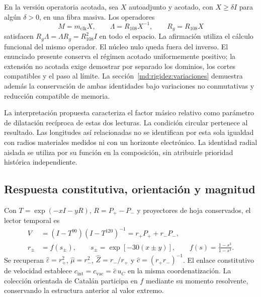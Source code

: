 En la versión operatoria acotada, sea $X$ autoadjunto y acotado, con
$X\geq\delta I$ para algún $\delta>0$, en una fibra masiva. Los operadores
\begin{equation}
 M=m_{\mathrm{clk}}X,\qquad
 \Lambda=R_{108}X^{-1},\qquad R_g=R_{108}X
 \label{md:hib:operadores-radiales}
\end{equation}
satisfacen $R_g\Lambda=\Lambda R_g=R_{108}^2I$ en todo el espacio.
La afirmación utiliza el cálculo funcional del mismo operador. El núcleo
nulo queda fuera del inverso. El enunciado presente conserva el régimen
acotado uniformemente positivo; la extensión no acotada exige demostrar
por separado los dominios, los cortes compatibles y el paso al límite.
La sección~\ref{md:rigidez:variaciones} demuestra además la conservación
de ambas identidades bajo variaciones no conmutativas y reducción
compatible de memoria.

La interpretación propuesta caracteriza el factor másico relativo como
parámetro de dilatación recíproca de estas dos lecturas. La condición circular
pertenece al resultado. Las longitudes así relacionadas no se identifican
por esta sola igualdad con radios materiales medidos ni con un horizonte
electrónico. La identidad radial aislada se utiliza por su función en la
composición, sin atribuirle prioridad histórica independiente.

\subsection{Respuesta constitutiva, orientación y magnitud}
\label{md:hib:constitutivas}

Con $T=\exp(-xI-yR)$, $R=P_+-P_-$ y proyectores de hoja conservados,
el lector temporal es
\begin{equation}
 \begin{aligned}
 V&=(I-T^{90})(I-T^{120})^{-1}=r_+P_++r_-P_-,\\
 r_\pm&=f(s_\pm),\qquad
 s_\pm=\exp[-30(x\pm y)],\qquad
 f(s)=\frac{1-s^3}{1-s^4}.
 \end{aligned}
 \label{md:hib:operador-constitutivo}
\end{equation}
Se recuperan $\widehat\varepsilon=r_+^2$, $\widehat\mu=r_-^2$,
$\widehat Z=r_-/r_+$ y $\widehat c=(r_+r_-)^{-1}$.
El enlace constitutivo de velocidad establece
$c_{\mathrm{int}}=c_{\mathrm{vac}}=\widehat c\,u_C$ en la misma coordenatización.
La colección orientada de Catalán participa en $f$ mediante su momento
resolvente, conservando la estructura anterior al valor extremo.


